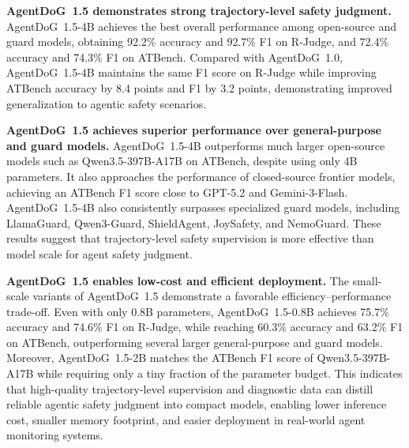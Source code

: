 \documentclass{llmxive}
\providecommand{\agentdog}{AgentDoG~1.5\xspace}
\begin{document}
\textbf{\agentdog{} demonstrates strong trajectory-level safety judgment.}
    \agentdog{}-4B achieves the best overall performance among open-source
    and guard models, obtaining 92.2\% accuracy and 92.7\% F1 on R-Judge, and
    72.4\% accuracy and 74.3\% F1 on ATBench. Compared with AgentDoG~1.0,
    \agentdog{}-4B maintains the same F1 score on R-Judge while improving
    ATBench accuracy by 8.4 points and F1 by 3.2 points, demonstrating
    improved generalization to agentic safety scenarios.

\textbf{\agentdog{} achieves superior performance over general-purpose and guard models.}
    \agentdog{}-4B outperforms much larger open-source models such as
    Qwen3.5-397B-A17B on ATBench, despite using only 4B parameters. It also
    approaches the performance of closed-source frontier models, achieving an
    ATBench F1 score close to GPT-5.2 and Gemini-3-Flash. \agentdog{}-4B
    also consistently surpasses specialized guard models, including LlamaGuard,
    Qwen3-Guard, ShieldAgent, JoySafety, and NemoGuard. These results suggest
    that trajectory-level safety supervision is more effective than model scale
    for agent safety judgment.

\textbf{\agentdog{} enables low-cost and efficient deployment.}
    The small-scale variants of \agentdog{} demonstrate a favorable
    efficiency--performance trade-off. Even with only 0.8B parameters,
    \agentdog{}-0.8B achieves 75.7\% accuracy and 74.6\% F1 on R-Judge, while
    reaching 60.3\% accuracy and 63.2\% F1 on ATBench, outperforming several
    larger general-purpose and guard models. Moreover, \agentdog{}-2B
    matches the ATBench F1 score of Qwen3.5-397B-A17B while requiring only a
    tiny fraction of the parameter budget. This indicates that high-quality
    trajectory-level supervision and diagnostic data can distill reliable
    agentic safety judgment into compact models, enabling lower inference
    cost, smaller memory footprint, and easier deployment in real-world agent
    monitoring systems.
\end{document}
